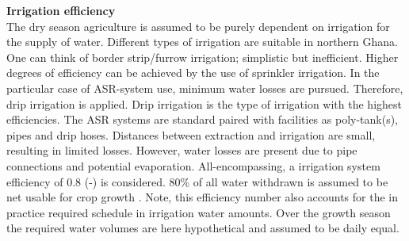 \textbf{Irrigation efficiency} \\
The dry season agriculture is assumed to be purely dependent on irrigation for the supply of water. Different types of irrigation are suitable in northern Ghana. One can think of border strip/furrow irrigation; simplistic but inefficient. Higher degrees of efficiency can be achieved by the use of sprinkler irrigation. In the particular case of ASR-system use, minimum water losses are pursued. Therefore, drip irrigation is applied. Drip irrigation is the type of irrigation with the highest efficiencies. The ASR systems are standard paired with facilities as poly-tank(s), pipes and drip hoses. Distances between extraction and irrigation are small, resulting in limited losses. However, water losses are present due to pipe connections and potential evaporation. All-encompassing, a irrigation system efficiency of 0.8 (-) is considered. 80\% of all water withdrawn is assumed to be net usable for crop growth \citep{VandeGiesen2013}. Note, this efficiency number also accounts for the in practice required schedule in irrigation water amounts. Over the growth season the required water volumes are here  hypothetical and assumed to be daily equal. \\
%
%
%
%
